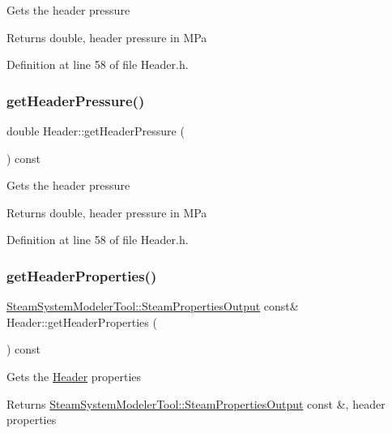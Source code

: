 Gets the header pressure \begin{DoxyReturn}{Returns}
double, header pressure in M\+Pa 
\end{DoxyReturn}


Definition at line 58 of file Header.\+h.

\mbox{\label{class_header_adc2e6daaf9f5e633c3db96ff3990f1f6}} 
\subsubsection{\texorpdfstring{get\+Header\+Pressure()}{getHeaderPressure()}\hspace{0.1cm}{\footnotesize\ttfamily [3/3]}}
{\footnotesize\ttfamily double Header\+::get\+Header\+Pressure (\begin{DoxyParamCaption}{ }\end{DoxyParamCaption}) const\hspace{0.3cm}{\ttfamily [inline]}}

Gets the header pressure \begin{DoxyReturn}{Returns}
double, header pressure in M\+Pa 
\end{DoxyReturn}


Definition at line 58 of file Header.\+h.

\mbox{\label{class_header_a0d27b0e1b3c16cc24b4ba6f64abb7cb0}} 
\subsubsection{\texorpdfstring{get\+Header\+Properties()}{getHeaderProperties()}\hspace{0.1cm}{\footnotesize\ttfamily [1/3]}}
{\footnotesize\ttfamily \hyperlink{struct_steam_system_modeler_tool_1_1_steam_properties_output}{Steam\+System\+Modeler\+Tool\+::\+Steam\+Properties\+Output} const\& Header\+::get\+Header\+Properties (\begin{DoxyParamCaption}{ }\end{DoxyParamCaption}) const\hspace{0.3cm}{\ttfamily [inline]}}

Gets the \hyperlink{class_header}{Header} properties \begin{DoxyReturn}{Returns}
\hyperlink{struct_steam_system_modeler_tool_1_1_steam_properties_output}{Steam\+System\+Modeler\+Tool\+::\+Steam\+Properties\+Output} const \&, header properties 
\end{DoxyReturn}


